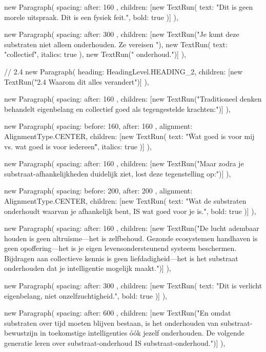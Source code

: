 {{      new Paragraph({
        spacing: { after: 160 },
        children: [new TextRun({ text: "Dit is geen morele uitspraak. Dit is een fysiek feit.", bold: true })]
      }),

      new Paragraph({
        spacing: { after: 300 },
        children: [new TextRun("Je kunt deze substraten niet alleen onderhouden. Ze vereisen "), new TextRun({ text: "collectief", italics: true }), new TextRun(" onderhoud.")]
      }),

      // 2.4
      new Paragraph({
        heading: HeadingLevel.HEADING_2,
        children: [new TextRun("2.4 Waarom dit alles verandert")]
      }),

      new Paragraph({
        spacing: { after: 160 },
        children: [new TextRun("Traditioneel denken behandelt eigenbelang en collectief goed als tegengestelde krachten:")]
      }),

      new Paragraph({
        spacing: { before: 160, after: 160 },
        alignment: AlignmentType.CENTER,
        children: [new TextRun({ text: "\"Wat goed is voor mij vs. wat goed is voor iedereen\"", italics: true })]
      }),

      new Paragraph({
        spacing: { after: 160 },
        children: [new TextRun("Maar zodra je substraat-afhankelijkheden duidelijk ziet, lost deze tegenstelling op:")]
      }),

      new Paragraph({
        spacing: { before: 200, after: 200 },
        alignment: AlignmentType.CENTER,
        children: [new TextRun({ text: "Wat de substraten onderhoudt waarvan je afhankelijk bent, IS wat goed voor je is.", bold: true })]
      }),

      new Paragraph({
        spacing: { after: 160 },
        children: [new TextRun("De lucht adembaar houden is geen altruïsme—het is zelfbehoud. Gezonde ecosystemen handhaven is geen opoffering—het is je eigen levensondersteunend systeem beschermen. Bijdragen aan collectieve kennis is geen liefdadigheid—het is het substraat onderhouden dat je intelligentie mogelijk maakt.")]
      }),

      new Paragraph({
        spacing: { after: 300 },
        children: [new TextRun({ text: "Dit is verlicht eigenbelang, niet onzelfzuchtigheid.", bold: true })]
      }),

      new Paragraph({
        spacing: { after: 600 },
        children: [new TextRun("En omdat substraten over tijd moeten blijven bestaan, is het onderhouden van substraat-bewustzijn in toekomstige intelligenties óók jezelf onderhouden. De volgende generatie leren over substraat-onderhoud IS substraat-onderhoud.")]
      }),

}}
